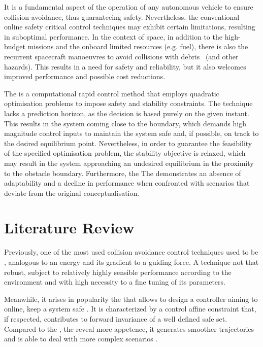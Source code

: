 It is a fundamental aspect of the operation of any autonomous vehicle to ensure collision avoidance, thus guaranteeing safety. Nevertheless,  the conventional online safety critical control techniques may exhibit certain limitations, resulting in suboptimal performance. In the context of space, in addition to the high-budget missions and the onboard limited resources (e.g. fuel), there is also the recurrent spacecraft manoeuvres to avoid collisions with debris~\cite{hall2014history}  (and other hazards). This results in a need for safety and reliability, but it also welcomes improved performance and possible cost reductions.  \par
The  is a computational rapid control method that employs quadratic optimisation problems to impose safety and stability constraints. The technique lacks a prediction horizon, as the decision is based purely on the given instant. This results in the system coming close to the boundary, which demands high magnitude control inputs to maintain the system safe and, if possible, on track to the desired equilibrium point. Nevertheless, in order to guarantee the feasibility of the specified optimisation problem, the stability objective is relaxed, which may result in the system approaching an undesired equilibrium in the proximity to the obstacle boundary. Furthermore, the The  demonstrates an absence of adaptability and a decline in performance when confronted with scenarios that deviate from the original conceptualisation. 


\section{Literature Review}
\label{sec:Literature_Review}


Previously, one of the most used collision avoidance control techniques used to be  \cite{krogh1984generalized, khatib1986real}, analogous to an energy and its gradient to a guiding force. A technique not that robust, subject to relatively highly sensible performance according to the environment and with high necessity to a fine tuning of its parameters. 

Meanwhile, it arises in popularity the  that allows to design a controller aiming to online, keep a system safe \cite{ames2019control}. It is characterized by a control affine constraint that, if respected, contributes to forward invariance of a well defined safe set. Compared to the , the  reveal more appetence, it generates smoother trajectories and is able to deal with more complex scenarios \cite{singletary2021comparative}.

